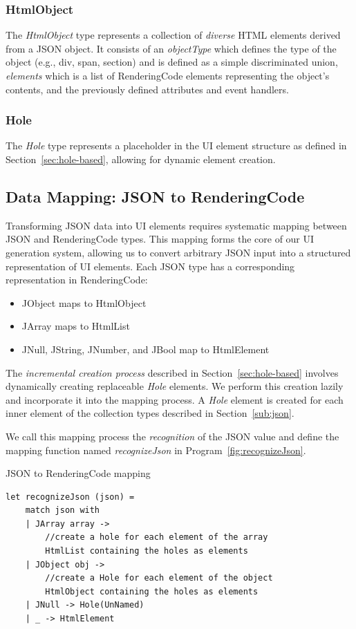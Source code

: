 \subsubsection{HtmlObject}
The \emph{HtmlObject} type represents a collection of \emph{diverse} HTML elements derived from a JSON object.
It consists of an \emph{objectType} which defines the type of the object (e.g., div, span, section) and is defined as a simple discriminated union,
\emph{elements} which is a list of RenderingCode elements representing the object's contents, and the previously defined attributes and event handlers.

\subsubsection{Hole}
The \emph{Hole} type represents a placeholder in the UI element structure as defined in Section~\ref{sec:hole-based}, allowing for dynamic element creation.

\subsection{Data Mapping: JSON to RenderingCode}
\label{sec:mapping}
Transforming JSON data into UI elements requires systematic mapping between JSON and RenderingCode types.
This mapping forms the core of our UI generation system, allowing us to convert arbitrary JSON input into a structured representation of UI elements.
Each JSON type has a corresponding representation in RenderingCode:
\begin{itemize}
	\item JObject maps to HtmlObject
	\item JArray maps to HtmlList
	\item JNull, JString, JNumber, and JBool map to HtmlElement
\end{itemize}

The \emph{incremental creation process} described in Section~\ref{sec:hole-based} involves dynamically creating replaceable \emph{Hole} elements.
We perform this creation lazily and incorporate it into the mapping process.
A \emph{Hole} element is created for each inner element of the collection types described in Section~\ref{sub:json}.

We call this mapping process the \emph{recognition} of the JSON value and define the mapping function named \emph{recognizeJson} in Program~\ref{fig:recognizeJson}.

\begin{listing}[htbp]
	\caption {JSON to RenderingCode mapping}
	\label{fig:recognizeJson}
	\begin{lstlisting}
let recognizeJson (json) =
    match json with
    | JArray array -> 
        //create a hole for each element of the array
        HtmlList containing the holes as elements
    | JObject obj ->
        //create a Hole for each element of the object 
        HtmlObject containing the holes as elements
    | JNull -> Hole(UnNamed)
    | _ -> HtmlElement 
  \end{lstlisting}
\end{listing}


